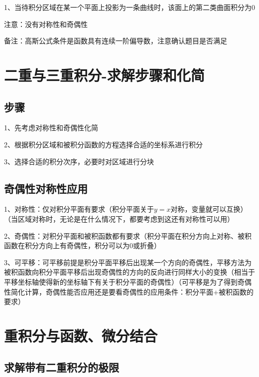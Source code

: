 1、当待积分区域在某一个平面上投影为一条曲线时，该面上的第二类曲面积分为0



注意：没有对称性和奇偶性

备注：高斯公式条件是函数具有连续一阶偏导数，注意确认题目是否满足

\section{二重与三重积分-求解步骤和化简}



\subsection{步骤}

1、先考虑对称性和奇偶性化简

2、根据积分区域和被积分函数的方程选择合适的坐标系进行积分

3、选择合适的积分次序，必要时对区域进行分块



\subsection{奇偶性对称性应用}

1、对称性：仅对积分平面有要求（积分平面关于$y=x$对称，变量就可以互换）（当区域对称时，无论是在什么情况下，都要考虑到这还有对称性可以用）

2、奇偶性：对积分平面和被积函数都有要求（积分平面在积分方向上对称、被积函数在积分方向上有奇偶性，积分可以为0或折叠）

3、可平移：可平移前提是积分平面平移后出现某一个方向的奇偶性，平移方法为被积函数向积分平面平移后出现奇偶性的方向的反向进行同样大小的变换（相当于平移坐标轴使得新的坐标轴下有关于积分平面的奇偶性）（可平移是为了得到奇偶性简化计算，奇偶性能否应用还是要看奇偶性的应用条件：积分平面+被积函数的要求）

\section{重积分与函数、微分结合}



\subsection{求解带有二重积分的极限}

